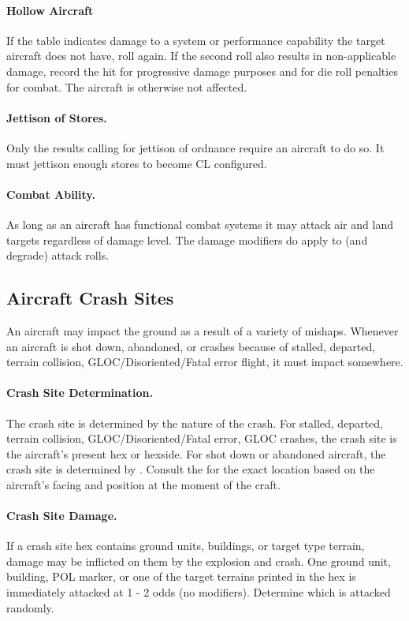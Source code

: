 \paragraph{Hollow Aircraft} If the table indicates damage to a system or performance capability the target aircraft does not have, roll again. If the second roll also results in non-applicable damage, record the hit for progressive damage purposes and for die roll penalties for combat. The aircraft is otherwise not affected.

\paragraph{Jettison of Stores.} Only the results calling for jettison of ordnance require an aircraft to do so. It must jettison enough stores to become CL configured.

\paragraph{Combat Ability.} As long as an aircraft has functional combat systems it may attack air and land targets regardless of damage level. The damage modifiers do apply to (and degrade) attack rolls.

\subsection{Aircraft Crash Sites}


An aircraft may impact the ground as a result of a variety of mishaps. Whenever an aircraft is shot down, abandoned, or crashes because of stalled, departed, terrain collision, GLOC/Disoriented/Fatal error flight, it must impact somewhere.

\paragraph{Crash Site Determination.} The crash site is determined by the nature of the crash. For stalled, departed, terrain collision, GLOC/Disoriented/Fatal error, GLOC crashes, the crash site is the aircraft's present hex or hexside. For shot down or abandoned aircraft, the crash site is determined by . Consult the  for the exact location based on the aircraft's facing and position at the moment of the craft.

\paragraph{Crash Site Damage.} If a crash site hex contains ground units, buildings, or target type terrain, damage may be inflicted on them by the explosion and crash. One ground unit, building, POL marker, or one of the target terrains printed in the hex is immediately attacked at 1 - 2 odds (no modifiers). Determine which is attacked randomly.
